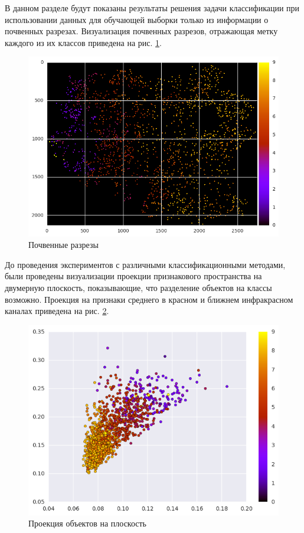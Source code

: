 \documentclass[14pt]{extarticle}
\begin{document}
\par
В данном разделе будут показаны результаты решения задачи классификации при использовании
данных для обучающей выборки только из информации о почвенных разрезах. Визуализация
почвенных разрезов, отражающая метку каждого из их классов приведена на 
рис. \ref{image:cuts}.
\begin{figure}[H]
\centering
\includegraphics[width=\linewidth]{imgs/cuts.png}
\caption{Почвенные разрезы}
\label{image:cuts}
\end{figure}
\par
До проведения экспериментов с различными классификационными методами, были проведены
визуализации проекции признакового пространства на двумерную плоскость, показывающие,
что разделение объектов на классы возможно. Проекция на признаки среднего в красном
и ближнем инфракрасном каналах приведена на рис. \ref{image:projection}.
\begin{figure}[H]
\centering
\includegraphics[width=\linewidth]{imgs/projection.png}
\caption{Проекция объектов на плоскость}
\label{image:projection}
\end{figure}
\end{document}
